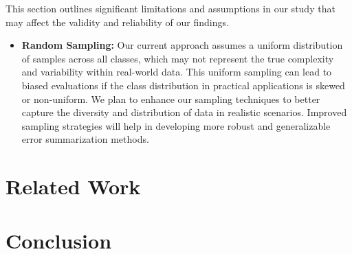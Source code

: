 \documentclass[10pt, conference, a4paper, final]{IEEEtran}
\begin{document}
This section outlines significant limitations and assumptions in our study that may affect the validity and reliability of our findings.

\begin{itemize}
    \item \textbf{Random Sampling:} Our current approach assumes a uniform distribution of samples across all classes, which may not represent the true complexity and variability within real-world data. This uniform sampling can lead to biased evaluations if the class distribution in practical applications is skewed or non-uniform. We plan to enhance our sampling techniques to better capture the diversity and distribution of data in realistic scenarios. Improved sampling strategies will help in developing more robust and generalizable error summarization methods.
\end{itemize}


\section{Related Work}

\section{Conclusion}
\end{document}
